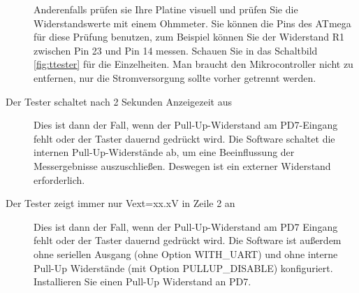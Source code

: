 \begin{description}
Anderenfalls prüfen sie Ihre Platine visuell und prüfen Sie die Widerstandswerte
mit einem Ohmmeter. Sie können die Pins des ATmega für diese Prüfung benutzen,
zum Beispiel können Sie der Widerstand R1 zwischen Pin 23 und Pin 14 messen.
Schauen Sie in das Schaltbild \ref{fig:ttester} für die Einzelheiten.
Man braucht den Mikrocontroller nicht zu entfernen, nur die Stromversorgung sollte
vorher getrennt werden.

\item[Der Tester schaltet nach 2 Sekunden Anzeigezeit aus]  
Dies ist dann der Fall, wenn der Pull-Up-Widerstand am PD7-Eingang
fehlt oder der Taster dauernd gedrückt wird. 
Die Software schaltet die internen Pull-Up-Widerstände ab, um eine Beeinflussung
der Messergebnisse auszuschließen. Deswegen ist ein externer Widerstand erforderlich.

\item[Der Tester zeigt immer nur Vext=xx.xV in Zeile 2 an]
Dies ist dann der Fall, wenn der Pull-Up-Widerstand am PD7 Eingang
fehlt oder der Taster dauernd gedrückt wird.
Die Software ist außerdem ohne seriellen Ausgang (ohne Option WITH\_UART) und
ohne interne Pull-Up Widerstände (mit Option PULLUP\_DISABLE) konfiguriert.
Installieren Sie einen Pull-Up Widerstand an PD7.

\end{description}
